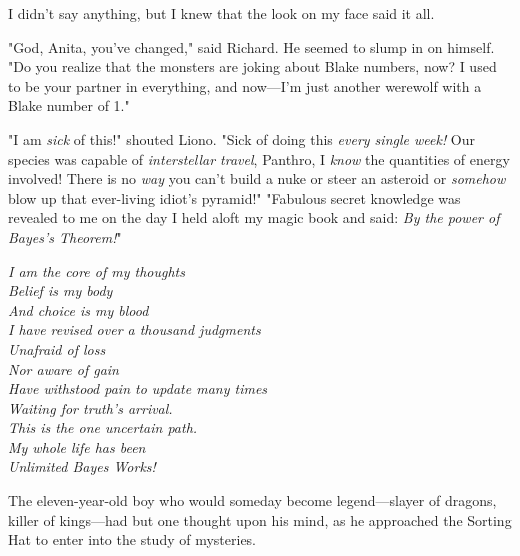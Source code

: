 I didn't say anything, but I knew that the look on my face said it all.

"God, Anita, you've changed," said Richard. He seemed to slump in on himself.
"Do you realize that the monsters are joking about Blake numbers, now? I used
to be your partner in everything, and now---I'm just another werewolf with a
Blake number of 1."
\sbreak
\newpage
{}

\noindent{}"I am \emph{sick} of this!" shouted Liono. "Sick of doing this \emph{every
single week!} Our species was capable of \emph{interstellar travel}, Panthro, I
\emph{know} the quantities of energy involved! There is no \emph{way} you can't
build a nuke or steer an asteroid or \emph{somehow} blow up that ever-living
idiot's pyramid!"
\sbreak
{}
\bigskip
"Fabulous secret knowledge was revealed to me on the day I held aloft my magic
book and said: \emph{By the power of Bayes's Theorem!}"
\sbreak
{}
\newpage
{}
\begin{center}
    \itshape
    I am the core of my thoughts\\
    Belief is my body\\
    And choice is my blood\\
    I have revised over a thousand judgments\\
    Unafraid of loss\\
    Nor aware of gain\\
    Have withstood pain to update many times\\
    Waiting for truth's arrival.\\
    This is the one uncertain path.\\
    My whole life has been\el\\
    Unlimited Bayes Works!
\end{center}
\sbreak
{}
\newpage
{}
\bigskip
The eleven-year-old boy who would someday become legend---slayer of dragons,
killer of kings---had but one thought upon his mind, as he approached the
Sorting Hat to enter into the study of mysteries.

